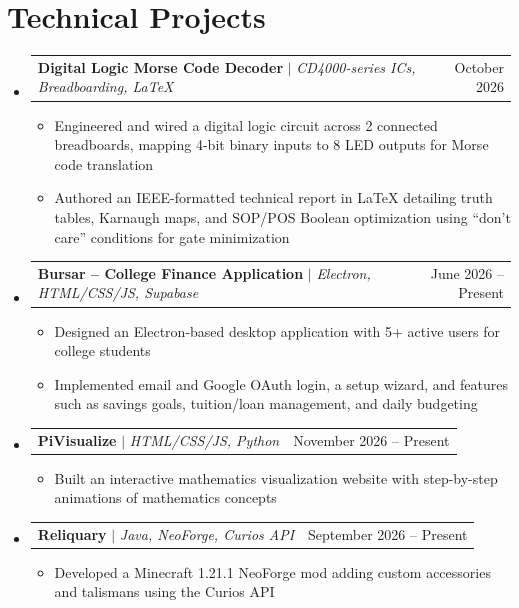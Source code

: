 \documentclass[letterpaper,11pt]{article}
\makeatletter
\newcommand{\resumeItem}[1]{
  \item\small{
    {#1 \vspace{-2pt}}
  }
}
\newcommand{\resumeProjectHeading}[2]{
    \item
    \begin{tabular*}{0.97\textwidth}{l@{\extracolsep{\fill}}r}
      \small#1 & #2 \\
    \end{tabular*}\vspace{-7pt}
}
\newcommand{\resumeSubHeadingListStart}{\begin{itemize}[leftmargin=0.15in, label={}]}
\newcommand{\resumeSubHeadingListEnd}{\end{itemize}}
\newcommand{\resumeItemListStart}{\begin{itemize}}
\newcommand{\resumeItemListEnd}{\end{itemize}\vspace{-5pt}}
\makeatother
\begin{document}
\section{Technical Projects}
  \resumeSubHeadingListStart
    \resumeProjectHeading
      {\textbf{Digital Logic Morse Code Decoder} $|$ \emph{CD4000-series ICs, Breadboarding, LaTeX}}{October 2026}
      \resumeItemListStart
        \resumeItem{Engineered and wired a digital logic circuit across 2 connected breadboards, mapping 4-bit binary inputs to 8 LED outputs for Morse code translation}
        \resumeItem{Authored an IEEE-formatted technical report in LaTeX detailing truth tables, Karnaugh maps, and SOP/POS Boolean optimization using ``don't care'' conditions for gate minimization}
      \resumeItemListEnd
    \resumeProjectHeading
      {\textbf{Bursar -- College Finance Application} $|$ \emph{Electron, HTML/CSS/JS, Supabase}}{June 2026 -- Present}
      \resumeItemListStart
        \resumeItem{Designed an Electron-based desktop application with 5+ active users for college students}
        \resumeItem{Implemented email and Google OAuth login, a setup wizard, and features such as savings goals, tuition/loan management, and daily budgeting}
      \resumeItemListEnd
    \resumeProjectHeading
      {\textbf{PiVisualize} $|$ \emph{HTML/CSS/JS, Python}}{November 2026 -- Present}
      \resumeItemListStart
        \resumeItem{Built an interactive mathematics visualization website with step-by-step animations of mathematics concepts}
      \resumeItemListEnd
    \resumeProjectHeading
      {\textbf{Reliquary} $|$ \emph{Java, NeoForge, Curios API}}{September 2026 -- Present}
      \resumeItemListStart
        \resumeItem{Developed a Minecraft 1.21.1 NeoForge mod adding custom accessories and talismans using the Curios API}
      \resumeItemListEnd
  \resumeSubHeadingListEnd
\end{document}
